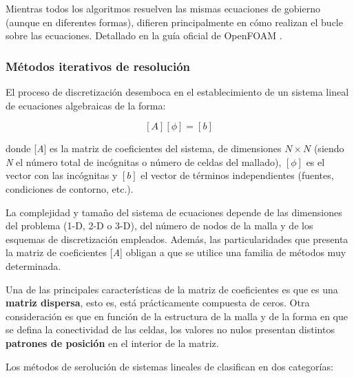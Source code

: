 Mientras todos los algoritmos resuelven las mismas ecuaciones de
gobierno (aunque en diferentes formas), difieren principalmente en cómo
realizan el bucle sobre las ecuaciones. Detallado en la guía oficial de
OpenFOAM \cite{algorithm}.

\subsubsection{Métodos iterativos de
resolución}\label{header-n431}

El proceso de discretización desemboca en el establecimiento de un
sistema lineal de ecuaciones algebraicas de la forma:

\[\left[A\right]\left[\phi\right]=\left[b\right]\]

donde {[}\emph{A}{]} es la matriz de coeficientes del sistema, de
dimensiones \(N\times N\) (siendo \emph{N} el número total de incógnitas
o número de celdas del mallado), \([\phi]\) es el vector con las
incógnitas y \([b]\) el vector de términos independientes (fuentes,
condiciones de contorno, etc.).

La complejidad y tamaño del sistema de ecuaciones depende de las
dimensiones del problema (1-D, 2-D o 3-D), del número de nodos de la
malla y de los esquemas de discretización empleados. Además, las
particularidades que presenta la matriz de coeficientes {[}\emph{A}{]}
obligan a que se utilice una familia de métodos muy determinada.

Una de las principales características de la matriz de coeficientes es
que es una \textbf{matriz dispersa}, esto es, está prácticamente
compuesta de ceros. Otra consideración es que en función de la
estructura de la malla y de la forma en que se defina la conectividad de
las celdas, los valores no nulos presentan distintos \textbf{patrones de
posición} en el interior de la matriz.

Los métodos de serolución de sistemas lineales de clasifican en dos
categorías:

